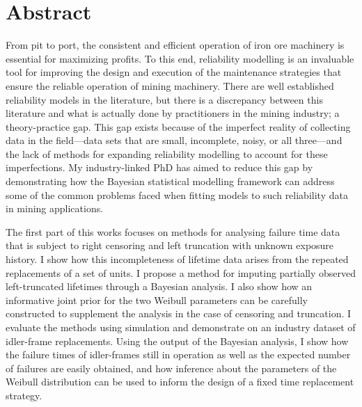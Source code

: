
\chapter*{Abstract} 

From pit to port, the consistent and efficient operation of iron ore machinery is essential for maximizing profits. To this end, reliability modelling is an invaluable tool for improving the design and execution of the maintenance strategies that ensure the reliable operation of mining machinery. There are well established reliability models in the literature, but there is a discrepancy between this literature and what is actually done by practitioners in the mining industry; a theory-practice gap. This gap exists because of the imperfect reality of collecting data in the field---data sets that are small, incomplete, noisy, or all three---and the lack of methods for expanding reliability modelling to account for these imperfections. My industry-linked PhD has aimed to reduce this gap by demonstrating how the Bayesian statistical modelling framework can address some of the common problems faced when fitting models to such reliability data in mining applications.

The first part of this works focuses on methods for analysing failure time data that is subject to right censoring and left truncation with unknown exposure history. I show how this incompleteness of lifetime data arises from the repeated replacements of a set of units. I propose a method for imputing partially observed left-truncated lifetimes through a Bayesian analysis. I also show how an informative joint prior for the two Weibull parameters can be carefully constructed to supplement the analysis in the case of censoring and truncation. I evaluate the methods using simulation and demonstrate on an industry dataset of idler-frame replacements. Using the output of the Bayesian analysis, I show how the failure times of idler-frames still in operation as well as the expected number of failures are easily obtained, and how inference about the parameters of the Weibull distribution can be used to inform the design of a fixed time replacement strategy.

